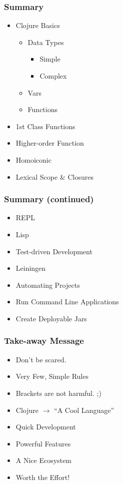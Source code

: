 \documentclass{beamer}
\begin{document}
  \begin{frame}[c]
    \frametitle{Summary}
    \begin{itemize}
        \item Clojure Basics
            \begin{itemize}
                \item Data Types
                    \begin{itemize}
                        \item Simple
                        \item Complex
                    \end{itemize}
                \item Vars
                \item Functions
            \end{itemize}
        \item 1st Class Functions
        \item Higher-order Function
        \item Homoiconic
        \item Lexical Scope \& Closures
    \end{itemize}
  \end{frame}

  \begin{frame}[c]
    \frametitle{Summary (continued)}
    \begin{itemize}
        \item REPL
        \item Lisp
        \item Test-driven Development
        \item Leiningen
        \item Automating Projects
        \item Run Command Line Applications
        \item Create Deployable Jars
    \end{itemize}
  \end{frame}

  \begin{frame}[c]
    \frametitle{Take-away Message}
    \begin{itemize}
        \item Don't be scared.
        \item Very Few, Simple Rules
        \item Brackets are not harmful. ;)
        \item Clojure $\rightarrow$ ``A Cool Language''
        \item Quick Development
        \item Powerful Features
        \item A Nice Ecosystem
        \item Worth the Effort!
    \end{itemize}
  \end{frame}
\end{document}
